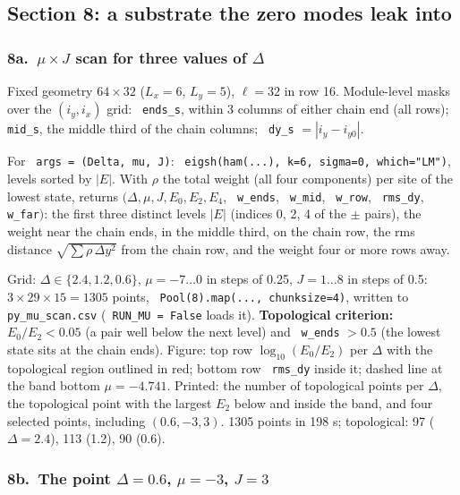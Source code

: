 \documentclass[11pt]{article}
\renewenvironment{function}[1]{\par\Needspace{7\baselineskip}\medskip\noindent{\raggedright\textbf{\large\texttt{\hyphenchar\font=-1 #1}}\par}\nopagebreak}{\par\medskip}
\renewcommand{\code}[1]{\texttt{\hyphenchar\font=-1 #1}}
\begin{document}
\subsection{Section 8: a substrate the zero modes leak into}

\subsubsection*{8a.\ \texorpdfstring{$\mu\times J$}{mu x J} scan for three values of \texorpdfstring{$\Delta$}{Delta}}

Fixed geometry $64\times32$ ($L_x = 6$, $L_y = 5$), $\ell = 32$ in row 16. Module-level masks over the $(i_y, i_x)$ grid: \code{ends\_s}, within 3
columns of either chain end (all rows); \code{mid\_s}, the middle third of the chain columns; \code{dy\_s} $=|i_y-i_{y0}|$.

\begin{function}{scan\_point(args)}
For \code{args = (Delta, mu, J)}: \code{eigsh(ham(...), k=6, sigma=0, which="LM")}, levels sorted by $|E|$. With $\rho$ the total weight
(all four components) per site of the lowest state, returns
$(\Delta, \mu, J, E_0, E_2, E_4$, \code{w\_ends}, \code{w\_mid}, \code{w\_row}, \code{rms\_dy}, \code{w\_far}$)$: the first three distinct levels
$|E|$ (indices 0, 2, 4 of the $\pm$ pairs), the weight near the chain ends, in the middle third, on the chain row, the rms distance
$\sqrt{\sum\rho\,\Delta y^2}$ from the chain row, and the weight four or more rows away.
\end{function}
Grid: $\Delta\in\{2.4, 1.2, 0.6\}$, $\mu = -7\dots0$ in steps of 0.25, $J = 1\dots8$ in steps of 0.5: $3\times29\times15 = 1305$ points,
\code{Pool(8).map(..., chunksize=4)}, written to \code{py\_mu\_scan.csv} (\code{RUN\_MU = False} loads it). \textbf{Topological criterion:}
$E_0/E_2<0.05$ (a pair well below the next level) and \code{w\_ends} $>0.5$ (the lowest state sits at the chain ends). Figure: top row
$\log_{10}(E_0/E_2)$ per $\Delta$ with the topological region outlined in red; bottom row \code{rms\_dy} inside it; dashed line at the band
bottom $\mu = -4.741$. Printed: the number of topological points per $\Delta$, the topological point with the largest $E_2$ below and inside
the band, and four selected points, including $(0.6, -3, 3)$. 1305 points in 198 s; topological: 97 ($\Delta = 2.4$), 113 (1.2), 90 (0.6).

\subsubsection*{8b.\ The point \texorpdfstring{$\Delta = 0.6$, $\mu = -3$, $J = 3$}{Delta = 0.6, mu = -3, J = 3}}
\end{document}
